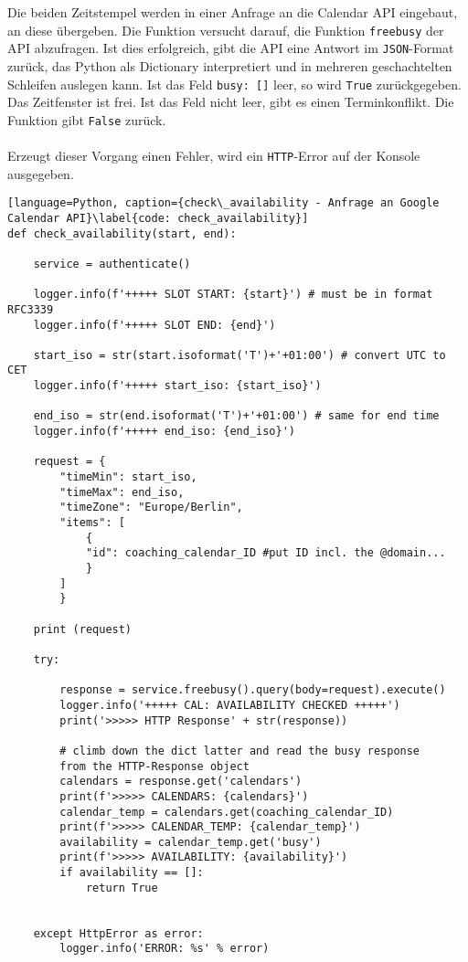         Die beiden Zeitstempel werden in einer Anfrage an die Calendar API eingebaut, an diese übergeben. Die Funktion versucht darauf, die Funktion \verb|freebusy| der API abzufragen. Ist dies erfolgreich, gibt die API eine Antwort im \verb|JSON|-Format zurück, das Python als Dictionary interpretiert und in mehreren geschachtelten Schleifen auslegen kann. Ist das Feld \verb|busy: []| leer, so wird \verb|True| zurückgegeben. Das Zeitfenster ist frei. Ist das Feld nicht leer, gibt es einen Terminkonflikt. Die Funktion gibt \verb|False| zurück. \\
        \\
        Erzeugt dieser Vorgang einen Fehler, wird ein \verb|HTTP|-Error auf der Konsole ausgegeben. \\
        \begin{lstlisting}[language=Python, caption={check\_availability - Anfrage an Google Calendar API}\label{code: check_availability}]
def check_availability(start, end):

    service = authenticate()
    
    logger.info(f'+++++ SLOT START: {start}') # must be in format RFC3339
    logger.info(f'+++++ SLOT END: {end}')

    start_iso = str(start.isoformat('T')+'+01:00') # convert UTC to CET
    logger.info(f'+++++ start_iso: {start_iso}')

    end_iso = str(end.isoformat('T')+'+01:00') # same for end time
    logger.info(f'+++++ end_iso: {end_iso}')

    request = {
        "timeMin": start_iso,
        "timeMax": end_iso,
        "timeZone": "Europe/Berlin", 
        "items": [
            {
            "id": coaching_calendar_ID #put ID incl. the @domain...
            }
        ]
        }

    print (request)
    
    try:
        
        response = service.freebusy().query(body=request).execute()
        logger.info('+++++ CAL: AVAILABILITY CHECKED +++++')
        print('>>>>> HTTP Response' + str(response))
    
        # climb down the dict latter and read the busy response 
        from the HTTP-Response object
        calendars = response.get('calendars')
        print(f'>>>>> CALENDARS: {calendars}')
        calendar_temp = calendars.get(coaching_calendar_ID)
        print(f'>>>>> CALENDAR_TEMP: {calendar_temp}')
        availability = calendar_temp.get('busy')
        print(f'>>>>> AVAILABILITY: {availability}')
        if availability == []:
            return True


    except HttpError as error:
        logger.info('ERROR: %s' % error)
                \end{lstlisting}

